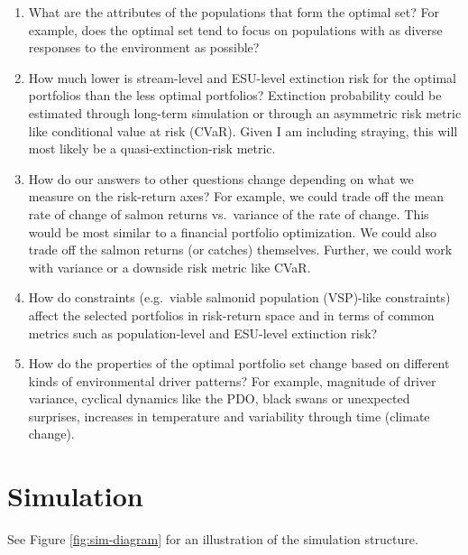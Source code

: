 \documentclass[12pt]{article}
\begin{document}
\begin{enumerate}
\def\labelenumi{\arabic{enumi}.}
\item
  What are the attributes of the populations that form the optimal set?
  For example, does the optimal set tend to focus on populations with as
  diverse responses to the environment as possible?
\item
  How much lower is stream-level and ESU-level extinction risk for the
  optimal portfolios than the less optimal portfolios? Extinction
  probability could be estimated through long-term simulation or through
  an asymmetric risk metric like conditional value at risk (CVaR). Given
  I am including straying, this will most likely be a
  quasi-extinction-risk metric.
\item
  How do our answers to other questions change depending on what we
  measure on the risk-return axes? For example, we could trade off the
  mean rate of change of salmon returns vs.~variance of the rate of
  change. This would be most similar to a financial portfolio
  optimization. We could also trade off the salmon returns (or catches)
  themselves. Further, we could work with variance or a downside risk
  metric like CVaR.
\item
  How do constraints (e.g.~viable salmonid population (VSP)-like
  constraints) affect the selected portfolios in risk-return space and
  in terms of common metrics such as population-level and ESU-level
  extinction risk?
\item
  How do the properties of the optimal portfolio set change based on
  different kinds of environmental driver patterns? For example,
  magnitude of driver variance, cyclical dynamics like the PDO, black
  swans or unexpected surprises, increases in temperature and
  variability through time (climate change).
\end{enumerate}

\section{Simulation}

See Figure \ref{fig:sim-diagram} for an illustration of the simulation
structure.
\end{document}
